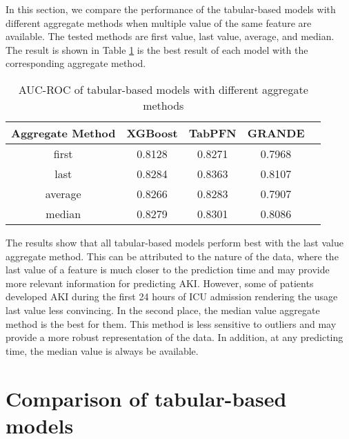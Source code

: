 \documentclass[../main.tex]{subfiles}
\begin{document}
In this section, we compare the performance of the tabular-based models with different aggregate methods when multiple value of the same feature are available.
The tested methods are first value, last value, average, and median.
The result is shown in Table \ref{tab:aggregate_methods} is the best result of each model with the corresponding aggregate method.

\begin{table}[H]
    \centering
    \caption{AUC-ROC of tabular-based models with different aggregate methods}
    \label{tab:aggregate_methods}
    \begin{tabular}{|c|c|c|c|c|}
        \hline
        \textbf{Aggregate Method} & 
        \textbf{XGBoost} & 
        \textbf{TabPFN} & 
        \textbf{GRANDE} \\
        \hline

        first & 
        0.8128 & 
        0.8271 & 
        0.7968 \\

        last & 
        0.8284 & 
        0.8363 & 
        0.8107 \\

        average & 
        0.8266 & 
        0.8283 & 
        0.7907 \\

        median &
        0.8279 &
        0.8301 &
        0.8086 \\

        \hline
    \end{tabular}
\end{table}

The results show that all tabular-based models perform best with the last value aggregate method.
This can be attributed to the nature of the data, where the last value of a feature is much closer to the prediction time and may provide more relevant information for predicting AKI.
However, some of patients developed \gls{AKI} during the first 24 hours of \gls{ICU} admission rendering the usage last value less convincing.
In the second place, the median value aggregate method is the best for them.
This method is less sensitive to outliers and may provide a more robust representation of the data.
In addition, at any predicting time, the median value is always be available.


\section{Comparison of tabular-based models}
\end{document}
